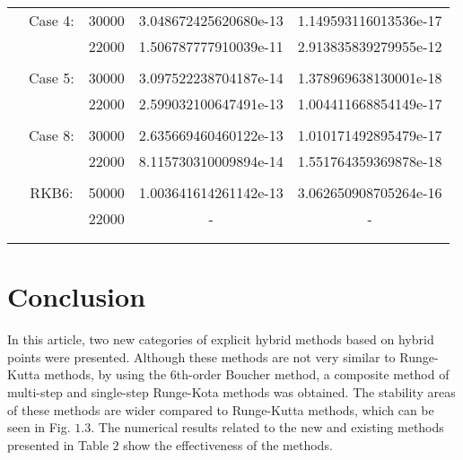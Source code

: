 \documentclass[11pt,twoside, final]{amsart}
\begin{document}
\begin{small}
\begin{table}
\begin{center}
\begin{tabular}{ccccc}
 &Case 4:&                                               30000 &3.048672425620680e-13     &1.149593116013536e-17\\
 &           &                                               22000 &1.506787777910039e-11    & 2.913835839279955e-12\\\\
 
 
     &Case 5:&                                30000 & 3.097522238704187e-14   &  1.378969638130001e-18\\
 &&                                              22000 &2.599032100647491e-13    & 1.004411668854149e-17\\\\

 
     &Case 8:&                                30000 &2.635669460460122e-13   &  1.010171492895479e-17\\
 &&                                              22000 &8.115730310009894e-14   &  1.551764359369878e-18\\\\

    &RKB6:&                                50000 &1.003641614261142e-13   &  3.062650908705264e-16\\
 &&                                              22000 &-   &  -\\\\

\hline\\
\end{tabular}
\end{center}
\end{table}
\end{small}
\newpage
\section{\textbf{Conclusion}}
In this article, two new categories of explicit hybrid methods based on hybrid points were presented. Although these methods are not very similar to Runge-Kutta methods, by using the 6th-order Boucher method, a composite method of multi-step and single-step Runge-Kota methods was obtained. The stability areas of these methods are wider compared to Runge-Kutta methods, which can be seen in Fig. $1.3$. The numerical results related to the new and existing methods presented in Table $2$ show the effectiveness of the methods.
\end{document}
